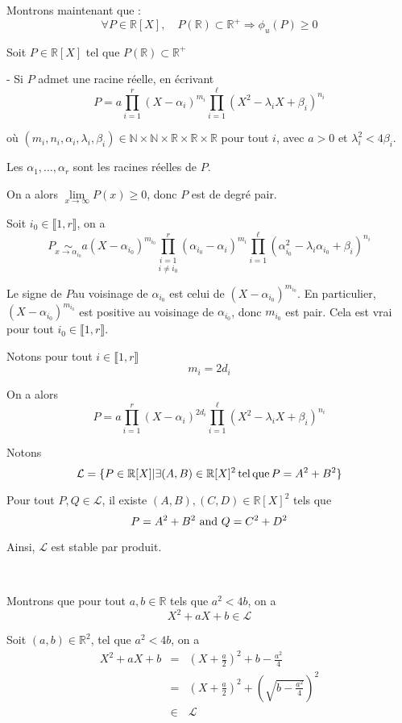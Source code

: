 Montrons maintenant que :
\[ \forall P \in \mathbb{R}[X], \quad P (\mathbb{R}) \subset \mathbb{R}^+
   \Rightarrow \phi_u (P) \geq 0 \]


Soit $P \in \mathbb{R}[X]$ tel que $P (\mathbb{R}) \subset \mathbb{R}^+$

- Si $P$ admet une racine r{\'e}elle, en {\'e}crivant
\[ P = a \prod_{i = 1}^r (X - \alpha_i)^{m_i}  \prod_{i = 1}^{\ell} (X^2 -
   \lambda_i X + \beta_i)^{n_i} \]


o{\`u} $(m_i, n_i, \alpha_i, \lambda_i, \beta_i) \in \mathbb{N} \times
\mathbb{N} \times \mathbb{R} \times \mathbb{R} \times \mathbb{R}$ pour tout
$i$, avec $a > 0$ et $\lambda_i^2 < 4 \beta_i$.

Les $\alpha_1, \ldots, \alpha_r$ sont les racines r{\'e}elles de $P$.

On a alors $\underset{x \to \infty}{\lim} P (x) \geq 0$, donc $P$ est de
degr{\'e} pair.

Soit $i_0 \in \llbracket 1, r \rrbracket$, on a
\[ P \underset{x \rightarrow \alpha_{i_0}}{\sim} a (X -
   \alpha_{i_0})^{m_{i_0}}  \underset{i \neq i_0}{\prod_{i = 1}^r}
   (\alpha_{i_0} - \alpha_i)^{m_i}  \prod_{i = 1}^{\ell} (\alpha_{i_0}^2 -
   \lambda_i \alpha_{i_0} + \beta_i)^{n_i} \]


Le signe de $P$au voisinage de $\alpha_{i_0}$ est celui de $(X -
\alpha_{i_0})^{m_{i_0}}$. En particulier, $(X - \alpha_{i_0})^{m_{i_0}}$ est
positive au voisinage de $\alpha_{i_0}$, donc $m_{i_0}$ est pair. Cela est
vrai pour tout $i_0 \in \llbracket 1, r \rrbracket$.

Notons pour tout $i \in \llbracket 1, r \rrbracket$
\[ m_i = 2 d_i \]


On a alors
\[ P = a \prod_{i = 1}^r (X - \alpha_i)^{2 d_i}  \prod_{i = 1}^{\ell} (X^2 -
   \lambda_i X + \beta_i)^{n_i} \]


Notons
\[ \mathcal{L}= \{ P \in \mathbb{R} [X]  |  \exists (A, B) \in
   \mathbb{R} [X]^2 \operatorname{tel} \operatorname{que} P = A^2 + B^2 \} \]


Pour tout $P, Q \in \mathcal{L}$, il existe $(A, B), (C, D) \in \mathbb{R}
[X]^2$ tels que
\[ P = A^2 + B^2 \text{ and } Q = C^2 + D^2 \]


Ainsi, $\mathcal{L}$ est stable par produit.

\

Montrons que pour tout $a, b \in \mathbb{R}$ tels que $a^2 < 4 b$, on a
\[ X^2 + a X + b \in \mathcal{L} \]


Soit $(a, b) \in \mathbb{R}^2$, tel que $a^2 < 4 b$, on a
\begin{eqnarray*}
  X^2 + a X + b & = & \left( X + \frac{a}{2} \right)^2 + b - \frac{a^2}{4}\\
  & = & \left( X + \frac{a}{2} \right)^2 + \left( \sqrt{b - \frac{a^2}{4}}
  \right)^2\\
  & \in & \mathcal{L}
\end{eqnarray*}


